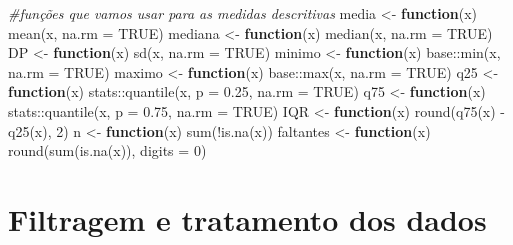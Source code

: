 \documentclass[
]{article}
\newenvironment{Shaded}{\begin{snugshade}}{\end{snugshade}}
\newcommand{\AttributeTok}[1]{\textcolor[rgb]{0.77,0.63,0.00}{#1}}
\newcommand{\CommentTok}[1]{\textcolor[rgb]{0.56,0.35,0.01}{\textit{#1}}}
\newcommand{\ConstantTok}[1]{\textcolor[rgb]{0.00,0.00,0.00}{#1}}
\newcommand{\ControlFlowTok}[1]{\textcolor[rgb]{0.13,0.29,0.53}{\textbf{#1}}}
\newcommand{\DecValTok}[1]{\textcolor[rgb]{0.00,0.00,0.81}{#1}}
\newcommand{\FloatTok}[1]{\textcolor[rgb]{0.00,0.00,0.81}{#1}}
\newcommand{\FunctionTok}[1]{\textcolor[rgb]{0.00,0.00,0.00}{#1}}
\newcommand{\NormalTok}[1]{#1}
\newcommand{\OtherTok}[1]{\textcolor[rgb]{0.56,0.35,0.01}{#1}}
\newcommand{\SpecialCharTok}[1]{\textcolor[rgb]{0.00,0.00,0.00}{#1}}
\begin{document}
\begin{Shaded}
\begin{Highlighting}[]
\CommentTok{\#funções que vamos usar para as medidas descritivas}
\NormalTok{media }\OtherTok{\textless{}{-}} \ControlFlowTok{function}\NormalTok{(x)}
  \FunctionTok{mean}\NormalTok{(x, }\AttributeTok{na.rm =} \ConstantTok{TRUE}\NormalTok{)}
\NormalTok{mediana }\OtherTok{\textless{}{-}} \ControlFlowTok{function}\NormalTok{(x)}
  \FunctionTok{median}\NormalTok{(x, }\AttributeTok{na.rm =} \ConstantTok{TRUE}\NormalTok{)}
\NormalTok{DP }\OtherTok{\textless{}{-}} \ControlFlowTok{function}\NormalTok{(x)}
  \FunctionTok{sd}\NormalTok{(x, }\AttributeTok{na.rm =} \ConstantTok{TRUE}\NormalTok{)}
\NormalTok{minimo }\OtherTok{\textless{}{-}} \ControlFlowTok{function}\NormalTok{(x)}
\NormalTok{  base}\SpecialCharTok{::}\FunctionTok{min}\NormalTok{(x, }\AttributeTok{na.rm =} \ConstantTok{TRUE}\NormalTok{)}
\NormalTok{maximo }\OtherTok{\textless{}{-}} \ControlFlowTok{function}\NormalTok{(x)}
\NormalTok{  base}\SpecialCharTok{::}\FunctionTok{max}\NormalTok{(x, }\AttributeTok{na.rm =} \ConstantTok{TRUE}\NormalTok{)}
\NormalTok{q25 }\OtherTok{\textless{}{-}} \ControlFlowTok{function}\NormalTok{(x)}
\NormalTok{  stats}\SpecialCharTok{::}\FunctionTok{quantile}\NormalTok{(x, }\AttributeTok{p =} \FloatTok{0.25}\NormalTok{, }\AttributeTok{na.rm =} \ConstantTok{TRUE}\NormalTok{)}
\NormalTok{q75 }\OtherTok{\textless{}{-}} \ControlFlowTok{function}\NormalTok{(x)}
\NormalTok{  stats}\SpecialCharTok{::}\FunctionTok{quantile}\NormalTok{(x, }\AttributeTok{p =} \FloatTok{0.75}\NormalTok{, }\AttributeTok{na.rm =} \ConstantTok{TRUE}\NormalTok{)}
\NormalTok{IQR }\OtherTok{\textless{}{-}} \ControlFlowTok{function}\NormalTok{(x)}
  \FunctionTok{round}\NormalTok{(}\FunctionTok{q75}\NormalTok{(x) }\SpecialCharTok{{-}} \FunctionTok{q25}\NormalTok{(x), }\DecValTok{2}\NormalTok{)}
\NormalTok{n }\OtherTok{\textless{}{-}} \ControlFlowTok{function}\NormalTok{(x)}
  \FunctionTok{sum}\NormalTok{(}\SpecialCharTok{!}\FunctionTok{is.na}\NormalTok{(x))}
\NormalTok{faltantes }\OtherTok{\textless{}{-}} \ControlFlowTok{function}\NormalTok{(x)}
  \FunctionTok{round}\NormalTok{(}\FunctionTok{sum}\NormalTok{(}\FunctionTok{is.na}\NormalTok{(x)), }\AttributeTok{digits =} \DecValTok{0}\NormalTok{)}
\end{Highlighting}
\end{Shaded}

\hypertarget{filtragem-e-tratamento-dos-dados}{%
\section{Filtragem e tratamento dos
dados}\label{filtragem-e-tratamento-dos-dados}}
\end{document}
